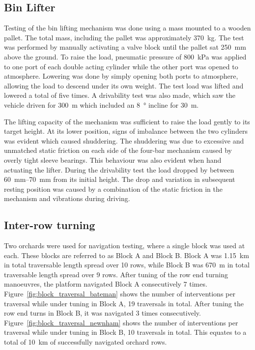 \documentclass[preprint,authoryear,12pt]{elsarticle}
\begin{document}
  \subsection{Bin Lifter}

    Testing of the bin lifting mechanism was done using a mass mounted to a wooden pallet.
    The total mass, including the pallet was approximately \SI{370}{\kilo\gram}.
    The test was performed by manually activating a valve block until the pallet sat \SI{250}{\milli\meter} above the ground.
    To raise the load, pneumatic pressure of \SI{800}{\kilo\pascal} was applied to one port of each double acting cylinder while the other port was opened to atmosphere.
    Lowering was done by simply opening both ports to atmosphere, allowing the load to descend under its own weight.
    The test load was lifted and lowered a total of five times.
    A drivability test was also made, which saw the vehicle driven for \SI{300}{\meter} which included an \SI{8}{\degree} incline for \SI{30}{\meter}.

    The lifting capacity of the mechanism was sufficient to raise the load gently to its target height.
    At its lower position, signs of imbalance between the two cylinders was evident which caused shuddering.
    The shuddering was due to excessive and unmatched static friction on each side of the four-bar mechanism caused by overly tight sleeve bearings.
    This behaviour was also evident when hand actuating the lifter.
    During the drivability test the load dropped by between \SIrange{60}{70}{\milli\meter} from its initial height.
    The drop and variation in subsequent resting position was caused by a combination of the static friction in the mechanism and vibrations during driving.

  \subsection{Inter-row turning}

    Two orchards were used for navigation testing, where a single block was used at each.
    These blocks are referred to as Block A and Block B.
    Block A was \SI{1.15}{\kilo\meter} in total traversable length spread over 10 rows, while Block B was \SI{670}{\meter} in total traversable length spread over 9 rows.
    After tuning of the row end turning manoeuvres, the platform navigated Block A consecutively 7 times.
    Figure~\ref{fig:block_traversal_bateman} shows the number of interventions per traversal while under tuning in Block A, 19 traversals in total.
    After tuning the row end turns in Block B, it was navigated 3 times consecutively.
    Figure~\ref{fig:block_traversal_newnham} shows the number of interventions per traversal while under tuning in Block B, 10 traversals in total.
    This equates to a total of \SI{10}{\kilo\meter} of successfully navigated orchard rows.
\end{document}
